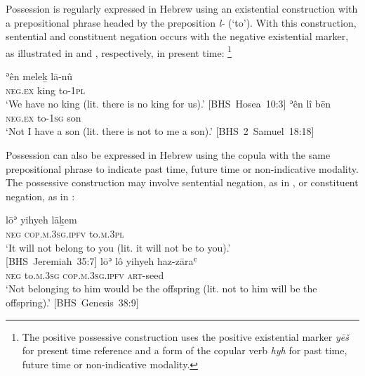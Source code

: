 \documentclass[output=paper,colorlinks,citecolor=brown,draft,draftmode]{langscibook}
\begin{document}
Possession is regularly expressed in Hebrew using an existential
construction with a prepositional phrase headed by the preposition
\textit{l-} (`to'). With this construction, sentential and constituent
negation occurs with the negative existential marker, as illustrated in
 and , respectively, in present
time:%
%
\footnote{The positive possessive construction uses the positive
existential marker \textit{yēš} for present time reference and a form of
the copular verb \textit{hyh} for past time, future time or non-indicative
modality.}
%
\begin{exe}\ex
\begin{xlist}\ex\label{ex:heb-no-king}
\gll ʾên meleḵ lā-nû\\ 
  \textsc{neg.ex}  king  to-1\textsc{pl}\\ 
  \glt `We have no king (lit. there is no king for us).'
  \mbox{[BHS Hosea 10:3]}
\ex\label{ex:heb-no-son}
\gll ʾên lî bēn\\
\textsc{neg.ex}  to-1\textsc{sg}  son\\ 
  \glt `Not I have a son (lit. there is not to me a son).'
  \mbox{[BHS 2 Samuel 18:18]}
\end{xlist}\end{exe}
Possession can also be expressed in Hebrew using the copula with the same
prepositional phrase to indicate past time, future time or non-indicative
modality. The possessive construction  may involve sentential negation, as
in , or constituent negation, as in
:
%
\begin{exe}\ex\begin{xlist}
\ex\label{ex:heb-not-for-you}
\gll lōʾ yihyeh lāḵem \\ 
  \textsc{neg} \textsc{cop.m.3sg.ipfv} to.\textsc{m.3pl}\\ 
  \glt `It will not belong to you (lit. it will not be to you).'\\
  \mbox{[BHS Jeremiah 35:7]}
\ex\label{ex:heb-no-offspring}
\gll lōʾ lô yihyeh haz-zāraʿ\\
\textsc{neg} to.\textsc{m.3sg} \textsc{cop.m.3sg.ipfv} \textsc{art}-seed\\
\glt `Not belonging to him would be the offspring (lit. not to him will be
the offspring).' \mbox{[BHS Genesis 38:9]}
\end{xlist}\end{exe}
\end{document}
